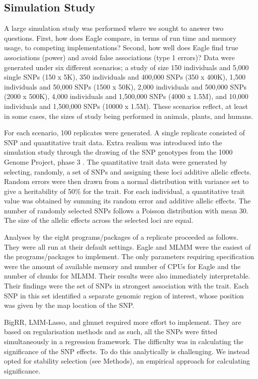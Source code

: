 \documentclass{nature}
\begin{document}
\subsection{Simulation Study}
A large simulation study was performed where we sought to  answer two questions. 
First, how does Eagle compare, in terms of run time and memory usage, to 
competing implementations? Second, how well does Eagle find true associations (power) and avoid 
false associations (type 1 errors)? Data were generated under six different scenarios; a study of size 150 individuals 
and 5,000 single SNPs (150 x 5K),  350 individuals and 400,000 SNPs (350 x 400K),  1,500 individuals and 
50,000 SNPs (1500 x 50K), 2,000 individuals and 500,000 SNPs (2000 x 500K), 4,000 individuals and 
1,500,000 SNPs (4000 x 1.5M), and 10,000 individuals and 1,500,000 SNPs (10000 x 1.5M).   
These scenarios reflect, at least in some cases, the sizes of study being performed in animals, plants, and humans.  

For each scenario, 100 replicates were generated. A single replicate consisted of SNP and quantitative trait data. 
Extra realism was introduced into the simulation study through the drawing of the SNP genotypes from the 1000 Genome Project, phase 3  \cite{10002010map}.
 The quantitative trait data were generated 
by selecting, randomly, a set of SNPs and assigning these loci additive allelic effects.  Random errors were then drawn from a normal distribution 
with variance set to give a heritability of 50\% for the trait. 
For each individual, a quantitative trait value was obtained by summing its random error and additive allelic effects. 
The number of randomly selected SNPs follows a Poisson distribution with mean 30. The size of the allelic effects 
 across the selected loci are equal.  
 
 Analyses by the eight programs/packages of a replicate proceeded as follows. They were all run at their default settings. 
 Eagle and MLMM were the easiest of the programs/packages to implement. 
 The only parameters requiring specification were the amount of available memory and number of CPUs for 
 Eagle and the number of chunks for MLMM. 
 Their results were also immediately 
 interpretable. Their findings were the set of SNPs in strongest association with the trait. Each 
SNP in this set identified a separate genomic region of interest, whose position was given by the map location of the SNP.  

BigRR, LMM-Lasso, and glmnet required more effort to implement. They are based on regularisation methods and as such, all the SNPs were fitted simultaneously in a regression 
framework. The difficulty was in calculating the significance of the SNP effects. To do this analytically is challenging. We instead opted for stability selection (see Methods),  
an empirical approach for calculating significance. 
\end{document}

